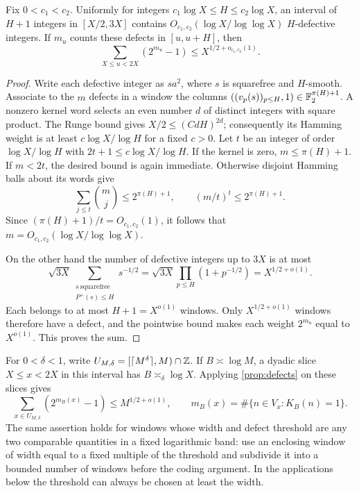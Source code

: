\begin{proposition}
\label{prop:defects}
Fix $0<c_1<c_2$. Uniformly for integers $c_1\log X\le H\le c_2\log X$, an
interval of $H+1$ integers in $[X/2,3X]$ contains
$O_{c_1,c_2}(\log X/\log\log X)$ $H$-defective integers. If $m_u$ counts
these defects in $[u,u+H]$, then
\begin{equation}\label{eq:defect-weight}
 \sum_{X\le u<2X}(2^{m_u}-1)\le X^{1/2+o_{c_1,c_2}(1)}.
\end{equation}
\end{proposition}
\begin{proof}
Write each defective integer as $sa^2$, where $s$ is squarefree and
$H$-smooth. Associate to the $m$ defects in a window the columns
$((v_p(s))_{p\le H},1)\in\mathbb F_2^{\pi(H)+1}$. A nonzero kernel word selects
an even number $d$ of distinct integers with square product. The Runge
bound gives $X/2\le(CdH)^{2d}$; consequently its Hamming weight is at
least $c\log X/\log H$ for a fixed $c>0$.
Let $t$ be an integer of order $\log X/\log H$ with
$2t+1\le c\log X/\log H$. If the kernel is zero, $m\le\pi(H)+1$.
If $m<2t$, the desired bound is again immediate. Otherwise disjoint
Hamming balls about its words give
\[
 \sum_{j\le t}\binom mj\le2^{\pi(H)+1},\qquad
 (m/t)^t\le2^{\pi(H)+1}.
\]
Since $(\pi(H)+1)/t=O_{c_1,c_2}(1)$, it follows that
$m=O_{c_1,c_2}(\log X/\log\log X)$.

On the other hand the number of defective integers up to $3X$ is at most
\[
 \sqrt{3X}\sum_{\substack{s\ \text{squarefree}\\P^+(s)\le H}}s^{-1/2}
 =\sqrt{3X}\prod_{p\le H}(1+p^{-1/2})=X^{1/2+o(1)}.
\]
Each belongs to at most $H+1=X^{o(1)}$ windows. Only
$X^{1/2+o(1)}$ windows therefore have a defect, and the pointwise bound
makes each weight $2^{m_u}$ equal to $X^{o(1)}$. This proves the sum.
\end{proof}

For $0<\delta<1$, write $U_{M,\delta}=[\lceil M^\delta\rceil,M)\cap\mathbb Z$.
If $B\asymp\log M$, a dyadic slice $X\le x<2X$ in this interval has
$B\asymp_\delta\log X$. Applying \cref{prop:defects} on these slices gives
\begin{equation}\label{eq:macro-defects}
 \sum_{x\in U_{M,\delta}}(2^{m_B(x)}-1)\le M^{1/2+o(1)},\qquad
 m_B(x)=\#\{n\in V_x:K_B(n)=1\}.
\end{equation}
The same assertion holds for windows whose width and defect threshold are
any two comparable quantities in a fixed logarithmic band: use an enclosing
window of width equal to a fixed multiple of the threshold and subdivide
it into a bounded number of windows before the coding argument. In the
applications below the threshold can always be chosen at least the width.

